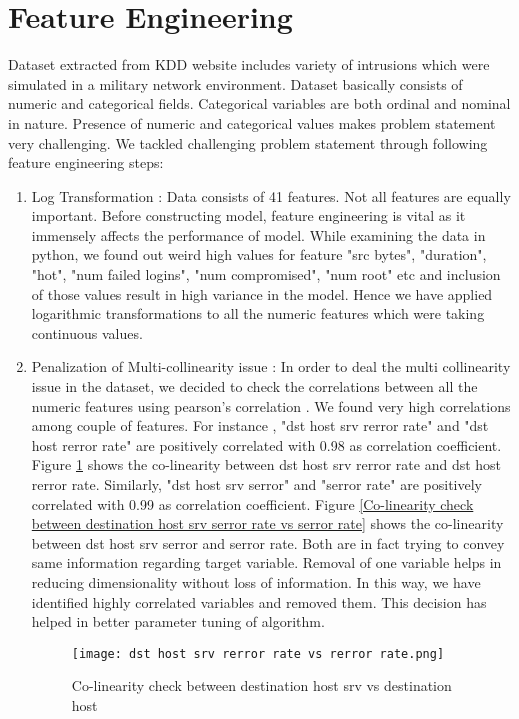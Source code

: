 \documentclass{acm_proc_article-sp}
\begin{document}
\section{Feature Engineering}
Dataset extracted from KDD website includes variety of intrusions which were simulated in a military network environment. Dataset basically consists of numeric and categorical fields. Categorical variables are both ordinal and nominal in nature. Presence of numeric and categorical values makes problem statement very challenging. 
We tackled challenging problem statement through following feature engineering steps:

\begin{enumerate}
\item Log Transformation : Data consists of 41 features. Not all features are equally important.  Before constructing model, feature engineering is vital as it immensely affects the performance of model. While examining the data in python, we found out weird high values for feature "src bytes", "duration", "hot", "num failed logins", "num compromised", "num root" etc and inclusion of those values result in high variance in the model. Hence we have applied logarithmic transformations to all the numeric features which were taking continuous values.
\item Penalization of Multi-collinearity issue : In order to deal the multi collinearity issue in the dataset, we decided to check the correlations between all the numeric features using pearson's correlation . We found very high correlations among couple of features. For instance , "dst host srv rerror rate" and "dst host rerror rate" are positively correlated with 0.98 as correlation coefficient. Figure \ref{Co-linearity check between destination host srv vs destination host} shows the co-linearity between dst host srv rerror rate and dst host rerror rate. Similarly, "dst host srv serror" and "serror rate" are positively correlated with 0.99 as correlation coefficient. Figure \ref{Co-linearity check between destination host srv serror rate vs serror rate} shows the co-linearity between dst host srv serror and serror rate. Both are in fact trying to convey same information regarding target variable. Removal of one variable helps in reducing dimensionality without loss of information. In this way, we have identified highly correlated variables and removed them. This decision has helped in better parameter tuning of algorithm.
\begin{figure}[h]
\texttt{[image: dst host srv rerror rate vs rerror rate.png]}
\centering
\caption{Co-linearity check between destination host srv vs destination host}
\label{Co-linearity check between destination host srv vs destination host}
\end{figure}


\end{enumerate}
\end{document}
